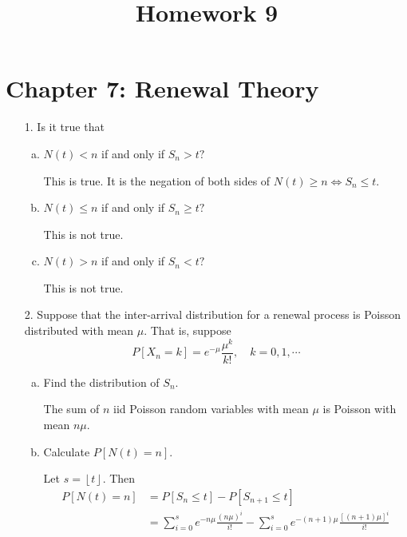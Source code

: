 \documentclass{article}
\begin{document}
\title{Homework 9}
\maketitle
\thispagestyle{fancy}

\section*{Chapter 7: Renewal Theory}

\begin{itemize}
	\item[1.] Is it true that
		\begin{enumerate}[(a)]
			\item $N(t)<n$ if and only if $S_n>t?$
				\begin{answer*}
					This is true. It is the negation of both sides of $N(t)\ge n\iff S_n\le t.$
				\end{answer*}

			\item $N(t)\le n$ if and only if $S_n\ge t?$
				\begin{answer*}
					This is not true. 
				\end{answer*}

			\item $N(t)>n$ if and only if $S_n<t?$
				\begin{answer*}
					This is not true.
				\end{answer*}
				
		\end{enumerate}

	\item[2.] Suppose that the inter-arrival distribution for a renewal process is Poisson distributed with mean $\mu.$ That is, suppose
		\[P[X_n=k] = e^{-\mu} \frac{\mu^k}{k!}, \quad k=0, 1, \cdots\]
		\begin{enumerate}[(a)]
			\item Find the distribution of $S_n.$
				\begin{answer*}
					The sum of $n$ iid Poisson random variables with mean $\mu$ is Poisson with mean $n\mu.$
				\end{answer*}

			\item Calculate $P[N(t)=n].$
				\begin{soln}
					Let $s=\left\lfloor t \right\rfloor.$ Then
					\begin{align*}
						P[N(t)=n] &= P[S_n\le t] - P[S_{n+1}\le t] \\
						&= \sum_{i=0}^{s} e^{-n\mu} \frac{(n\mu)^i}{i!} - \sum_{i=0}^{s} e^{-(n+1)\mu} \frac{[(n+1)\mu]^i}{i!}
					\end{align*}
				\end{soln}
				

\end{enumerate}
\end{itemize}
\end{document}
